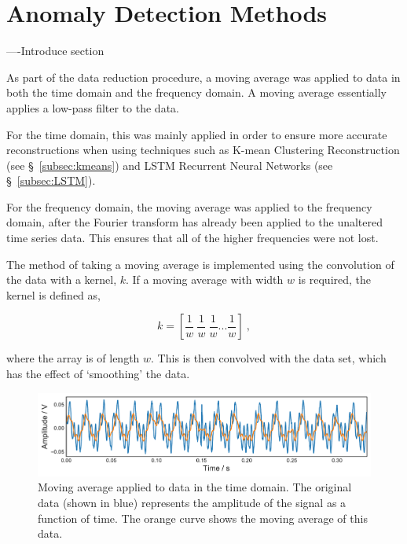 \section{Anomaly Detection Methods}
\label{sec:methods}

----Introduce section

As part of the data reduction procedure, a moving average was applied to data in both the time domain and the frequency domain. A moving average essentially applies a low-pass filter to the data.

For the time domain, this was mainly applied in order to ensure more accurate reconstructions when using techniques such as K-mean Clustering Reconstruction (see \S~\ref{subsec:kmeans}) and LSTM Recurrent Neural Networks (see \S~\ref{subsec:LSTM}).

For the frequency domain, the moving average was applied to the frequency domain, after the Fourier transform has already been applied to the unaltered time series data. This ensures that all of the higher frequencies were not lost.

The method of taking a moving average is implemented using the convolution of the data with a kernel, $k$. If a moving average with width $w$ is required, the kernel is defined as,

\begin{equation}
    k = \left[ \dfrac{1}{w}~\dfrac{1}{w}~\dfrac{1}{w}...\dfrac{1}{w}  \right]~,
    \label{eq:conv_kernel}
\end{equation}

where the array is of length $w$. This is then convolved with the data set, which has the effect of `smoothing' the data.

\begin{figure}[t]
    \includegraphics[width=1.0\textwidth]{fig/moving_average.pdf}
    \caption[Time Domain]{Moving average applied to data in the time domain. The original data (shown in blue) represents the amplitude of the signal as a function of time. The orange curve shows the moving average of this data.}
    \label{fig:moving_av}
\end{figure}

